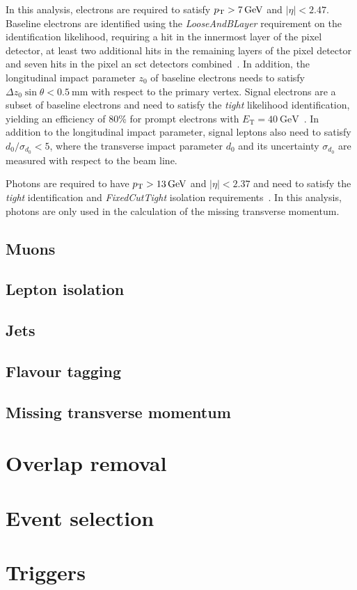 In this analysis, electrons are required to satisfy $p_{\textrm{T}} > \SI{7}{GeV}$ and $\vert\eta\vert<2.47$. Baseline electrons are identified using the \textit{LooseAndBLayer} requirement on the identification likelihood, requiring a hit in the innermost layer of the pixel detector, at least two additional hits in the remaining layers of the pixel detector and seven hits in the pixel an \gls{sct} detectors combined~\cite{PERF-2017-01}. In addition, the longitudinal impact parameter $z_0$ of baseline electrons needs to satisfy $\Delta z_0\sin\theta < \SI{0.5}{\milli\meter}$ with respect to the primary vertex. Signal electrons are a subset of baseline electrons and need to satisfy the \textit{tight} likelihood identification, yielding an efficiency of 80\% for prompt electrons with $E_\mathrm{T}=\SI{40}{\GeV}$~\cite{PERF-2017-01}. In addition to the longitudinal impact parameter, signal leptons also need to satisfy $d_0/\sigma_{d_0} < 5$, where the transverse impact parameter $d_0$ and its uncertainty $\sigma_{d_0}$ are measured with respect to the beam line.

Photons are required to have $p_{\textrm{T}} > \SI{13}{GeV}$ and $\vert\eta\vert<2.37$ and need to satisfy the \textit{tight} identification and \textit{FixedCutTight} isolation requirements~\cite{EGAM-2018-01}. In this analysis, photons are only used in the calculation of the missing transverse momentum.

\subsection{Muons}

\subsection{Lepton isolation}

\subsection{Jets}

\subsection{Flavour tagging}

\subsection{Missing transverse momentum}

\section{Overlap removal}

\section{Event selection}

\section{Triggers}
